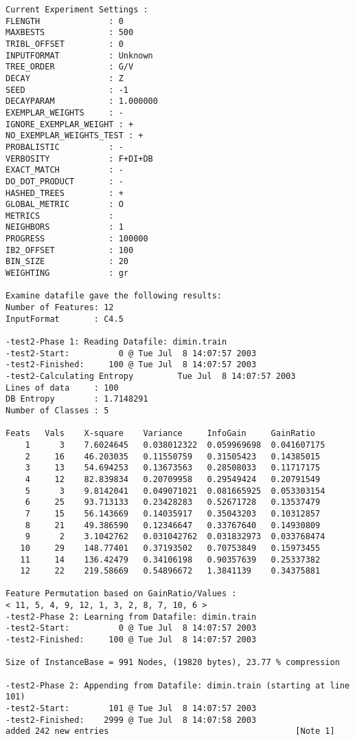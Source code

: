 \begin{verbatim}
Current Experiment Settings :
FLENGTH              : 0
MAXBESTS             : 500
TRIBL_OFFSET         : 0
INPUTFORMAT          : Unknown
TREE_ORDER           : G/V
DECAY                : Z
SEED                 : -1
DECAYPARAM           : 1.000000
EXEMPLAR_WEIGHTS     : -
IGNORE_EXEMPLAR_WEIGHT : +
NO_EXEMPLAR_WEIGHTS_TEST : +
PROBALISTIC          : -
VERBOSITY            : F+DI+DB
EXACT_MATCH          : -
DO_DOT_PRODUCT       : -
HASHED_TREES         : +
GLOBAL_METRIC        : O
METRICS              : 
NEIGHBORS            : 1
PROGRESS             : 100000
IB2_OFFSET           : 100
BIN_SIZE             : 20
WEIGHTING            : gr

Examine datafile gave the following results:
Number of Features: 12
InputFormat       : C4.5

-test2-Phase 1: Reading Datafile: dimin.train
-test2-Start:          0 @ Tue Jul  8 14:07:57 2003
-test2-Finished:     100 @ Tue Jul  8 14:07:57 2003
-test2-Calculating Entropy         Tue Jul  8 14:07:57 2003
Lines of data     : 100
DB Entropy        : 1.7148291
Number of Classes : 5

Feats   Vals    X-square    Variance     InfoGain     GainRatio
    1      3    7.6024645   0.038012322  0.059969698  0.041607175
    2     16    46.203035   0.11550759   0.31505423   0.14385015
    3     13    54.694253   0.13673563   0.28508033   0.11717175
    4     12    82.839834   0.20709958   0.29549424   0.20791549
    5      3    9.8142041   0.049071021  0.081665925  0.053303154
    6     25    93.713133   0.23428283   0.52671728   0.13537479
    7     15    56.143669   0.14035917   0.35043203   0.10312857
    8     21    49.386590   0.12346647   0.33767640   0.14930809
    9      2    3.1042762   0.031042762  0.031832973  0.033768474
   10     29    148.77401   0.37193502   0.70753849   0.15973455
   11     14    136.42479   0.34106198   0.90357639   0.25337382
   12     22    219.58669   0.54896672   1.3841139    0.34375881

Feature Permutation based on GainRatio/Values :
< 11, 5, 4, 9, 12, 1, 3, 2, 8, 7, 10, 6 >
-test2-Phase 2: Learning from Datafile: dimin.train
-test2-Start:          0 @ Tue Jul  8 14:07:57 2003
-test2-Finished:     100 @ Tue Jul  8 14:07:57 2003

Size of InstanceBase = 991 Nodes, (19820 bytes), 23.77 % compression

-test2-Phase 2: Appending from Datafile: dimin.train (starting at line 101)
-test2-Start:        101 @ Tue Jul  8 14:07:57 2003
-test2-Finished:    2999 @ Tue Jul  8 14:07:58 2003
added 242 new entries                                      [Note 1]


\end{verbatim}
